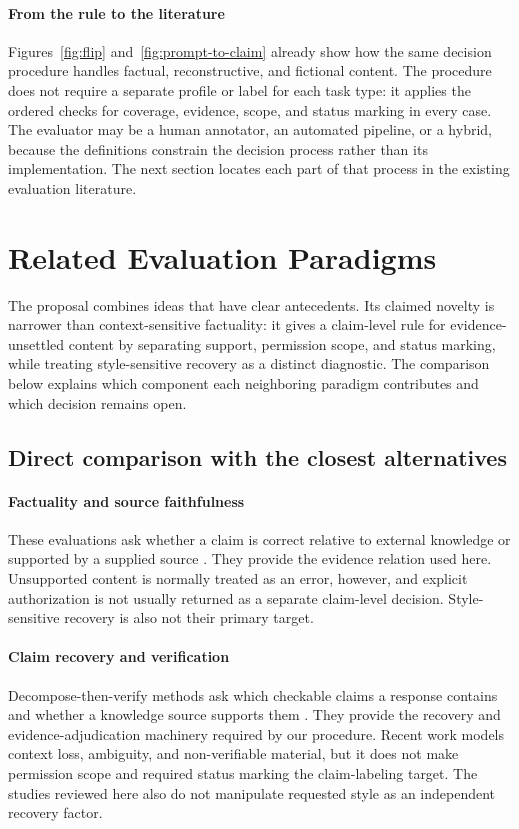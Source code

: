 \documentclass{clv2025}
\begin{document}
\paragraph{From the rule to the literature}
Figures~\ref{fig:flip} and~\ref{fig:prompt-to-claim} already show how the
same decision procedure handles factual, reconstructive, and fictional
content.
The procedure does not require a separate profile or label for each task
type: it applies the ordered checks for coverage, evidence, scope, and
status marking in every case.
The evaluator may be a human annotator, an automated pipeline, or a hybrid,
because the definitions constrain the decision process rather than its
implementation.
The next section locates each part of that process in the existing
evaluation literature.

\section{Related Evaluation Paradigms}\label{sec:related}

The proposal combines ideas that have clear antecedents.
Its claimed novelty is narrower than context-sensitive factuality: it gives
a claim-level rule for evidence-unsettled content by separating support,
permission scope, and status marking, while treating style-sensitive
recovery as a distinct diagnostic.
The comparison below explains which component each neighboring paradigm
contributes and which decision remains open.

\subsection{Direct comparison with the closest alternatives}

\paragraph{Factuality and source faithfulness}
These evaluations ask whether a claim is correct relative to external
knowledge or supported by a supplied source
\citep{maynez_faithfulness_2020,kryscinski_evaluating_2020}.
They provide the evidence relation used here.
Unsupported content is normally treated as an error, however, and explicit
authorization is not usually returned as a separate claim-level decision.
Style-sensitive recovery is also not their primary target.

\paragraph{Claim recovery and verification}
Decompose-then-verify methods ask which checkable claims a response
contains and whether a knowledge source supports them
\citep{min_factscore_2023,song_veriscore_2024,metropolitansky_claimify_2025}.
They provide the recovery and evidence-adjudication machinery required by
our procedure.
Recent work models context loss, ambiguity, and non-verifiable material,
but it does not make permission scope and required status marking the
claim-labeling target.
The studies reviewed here also do not manipulate requested style as an
independent recovery factor.
\end{document}
